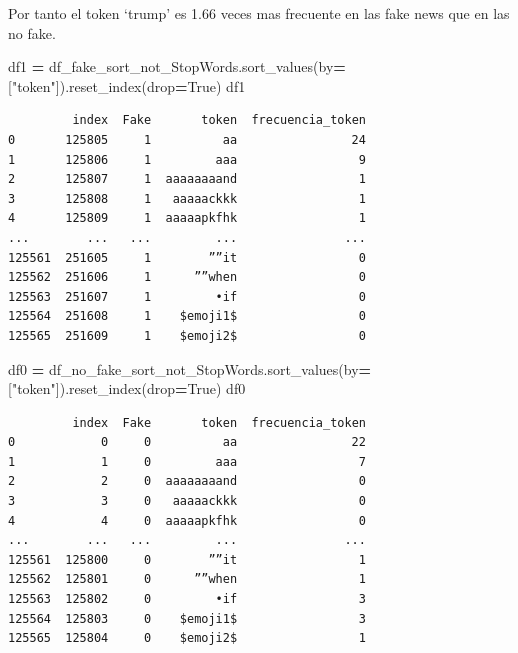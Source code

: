 \documentclass[
  11pt,
  a4paper,
]{article}
\newenvironment{Shaded}{\begin{snugshade}}{\end{snugshade}}
\newcommand{\NormalTok}[1]{#1}
\newcommand{\OperatorTok}[1]{\textcolor[rgb]{0.81,0.36,0.00}{\textbf{#1}}}
\newcommand{\StringTok}[1]{\textcolor[rgb]{0.31,0.60,0.02}{#1}}
\newcommand{\VariableTok}[1]{\textcolor[rgb]{0.00,0.00,0.00}{#1}}
\begin{document}
Por tanto el token `trump' es 1.66 veces mas frecuente en las fake news
que en las no fake.

\begin{Shaded}
\begin{Highlighting}[]
\NormalTok{df1 }\OperatorTok{=}\NormalTok{ df\_fake\_sort\_not\_StopWords.sort\_values(by}\OperatorTok{=}\NormalTok{[}\StringTok{"token"}\NormalTok{]).reset\_index(drop}\OperatorTok{=}\VariableTok{True}\NormalTok{)}
\NormalTok{df1}
\end{Highlighting}
\end{Shaded}

\begin{verbatim}
         index  Fake       token  frecuencia_token
0       125805     1          aa                24
1       125806     1         aaa                 9
2       125807     1  aaaaaaaand                 1
3       125808     1   aaaaackkk                 1
4       125809     1  aaaaapkfhk                 1
...        ...   ...         ...               ...
125561  251605     1        ””it                 0
125562  251606     1      ””when                 0
125563  251607     1         •if                 0
125564  251608     1    $emoji1$                 0
125565  251609     1    $emoji2$️                 0
\end{verbatim}

\begin{Shaded}
\begin{Highlighting}[]
\NormalTok{df0 }\OperatorTok{=}\NormalTok{ df\_no\_fake\_sort\_not\_StopWords.sort\_values(by}\OperatorTok{=}\NormalTok{[}\StringTok{"token"}\NormalTok{]).reset\_index(drop}\OperatorTok{=}\VariableTok{True}\NormalTok{)}
\NormalTok{df0}
\end{Highlighting}
\end{Shaded}

\begin{verbatim}
         index  Fake       token  frecuencia_token
0            0     0          aa                22
1            1     0         aaa                 7
2            2     0  aaaaaaaand                 0
3            3     0   aaaaackkk                 0
4            4     0  aaaaapkfhk                 0
...        ...   ...         ...               ...
125561  125800     0        ””it                 1
125562  125801     0      ””when                 1
125563  125802     0         •if                 3
125564  125803     0    $emoji1$                 3
125565  125804     0    ️$emoji2$                 1
\end{verbatim}
\end{document}
